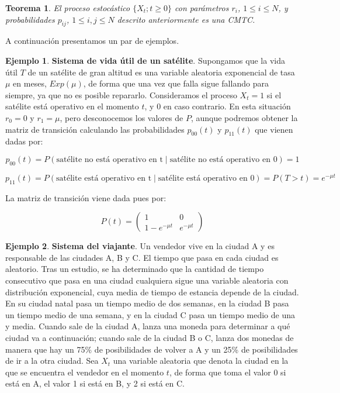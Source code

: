 \documentclass[
]{book}
\newtheorem{theorem}{Teorema}[chapter]
\theoremstyle{definition}
\theoremstyle{definition}
\newtheorem{example}{Ejemplo}[chapter]
\theoremstyle{definition}
\theoremstyle{definition}
\theoremstyle{remark}
\begin{document}
\begin{theorem}
\protect\hypertarget{thm:thecmtc001}{}\label{thm:thecmtc001}El proceso estocástico \(\{X_t; t \geq 0\}\) con parámetros \(r_i\), \(1 \leq i \leq N\), y probabilidades \(p_{ij}\), \(1 \leq i,j \leq N\) descrito anteriormente es una CMTC.
\end{theorem}

A continuación presentamos un par de ejemplos.

\begin{example}
\protect\hypertarget{exm:excmtc001}{}\label{exm:excmtc001}\textbf{Sistema de vida útil de un satélite}. Supongamos que la vida útil \(T\) de un satélite de gran altitud es una variable aleatoria exponencial de tasa \(\mu\) en meses, \(Exp(\mu)\), de forma que una vez que falla sigue fallando para siempre, ya que no es posible repararlo. Consideramos el proceso \(X_t = 1\) si el satélite está operativo en el momento \(t\), y 0 en caso contrario. En esta situación \(r_0 = 0\) y \(r_1 = \mu\), pero desconocemos los valores de \(P\), aunque podremos obtener la matriz de transición calculando las probabilidades \(p_{00}(t)\) y \(p_{11}(t)\) que vienen dadas por:

\[p_{00}(t) = P(\text{satélite no está operativo en t} \mid \text{satélite no está operativo en 0}) = 1\]

\[p_{11}(t) = P(\text{satélite está operativo en t} \mid \text{satélite está operativo en 0}) = P(T >t) = e^{-\mu t}\]

La matriz de transición viene dada pues por:

\[P(t) = 
\begin{pmatrix}
1 & 0\\
1- e^{-\mu t} & e^{-\mu t} 
\end{pmatrix}\]
\end{example}

\begin{example}
\protect\hypertarget{exm:excmtc002}{}\label{exm:excmtc002}\textbf{Sistema del viajante}. Un vendedor vive en la ciudad A y es responsable de las ciudades A, B y C. El tiempo que pasa en cada ciudad es aleatorio. Tras un estudio, se ha determinado que la cantidad de tiempo consecutivo que pasa en una ciudad cualquiera sigue una variable aleatoria con distribución exponencial, cuya media de tiempo de estancia depende de la ciudad. En su ciudad natal pasa un tiempo medio de dos semanas, en la ciudad B pasa un tiempo medio de una semana, y en la ciudad C pasa un tiempo medio de una y media. Cuando sale de la ciudad A, lanza una moneda para determinar a qué ciudad va a continuación; cuando sale de la ciudad B o C, lanza dos monedas de manera que hay un 75\% de posibilidades de volver a A y un 25\% de posibilidades de ir a la otra ciudad. Sea \(X_t\) una variable aleatoria que denota la ciudad en la que se encuentra el vendedor en el momento \(t\), de forma que toma el valor 0 si está en A, el valor 1 si está en B, y 2 si está en C.
\end{example}
\end{document}
